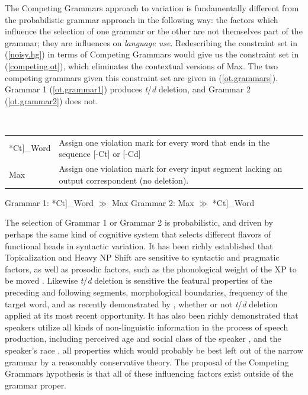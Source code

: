 The Competing Grammars approach to variation is fundamentally different from the probabilistic grammar approach in the following way: the factors which influence the selection of one grammar or the other are not themselves part of the grammar; they are influences on \textsl{language use}.
Redescribing the constraint set in (\ref{noisy.hg}) in terms of Competing Grammars would give us the constraint set in (\ref{competing.ot}), which eliminates the contextual versions of {\sc Max}.
The two competing grammars given this constraint set are given in (\ref{ot.grammars}).
Grammar 1 (\ref{ot.grammar1}) produces {\sl t}/{\sl d} deletion, and Grammar 2 (\ref{ot.grammar2}) does not.
\begin{exe}
	\ex \label{competing.ot}\ \\
	\begin{tabular}{lp{3in}}
	*{\sc Ct}]_{Word}& Assign one violation mark for every word that ends in the sequence [-Ct] or [-Cd]\\
	{\sc Max} & Assign one violation mark for every input segment lacking an output correspondent (no deletion).
	\end{tabular}
	\ex \label{ot.grammars}
		\begin{xlist}
			\ex Grammar 1: *{\sc Ct}]_{Word} $\gg$ {\sc Max} \label{ot.grammar1}
			\ex Grammar 2: {\sc Max} $\gg$ *{\sc Ct}]_{Word} \label{ot.grammar2}
		\end{xlist}
\end{exe}

The selection of Grammar 1 or Grammar 2 is probabilistic, and driven by perhaps the same kind of cognitive system that selects different flavors of functional heads in syntactic variation.
It has been richly established that Topicalization and Heavy NP Shift are sensitive to syntactic and pragmatic factors, as well as prosodic factors, such as the phonological weight of the XP to be moved \citep[e.g.][]{arnoldetal2000, speyer2008, speyer2010, wallenberg2012}. %
Likewise {\sl t}/{\sl d} deletion is sensitive the featural properties of the preceding and following segments, morphological boundaries, frequency of the target word, and as recently demonstrated by \citet{MacKenzie.Tamminga2012}, whether or not {\sl t}/{\sl d} deletion applied at its most recent opportunity.
It has also been richly demonstrated that speakers utilize all kinds of non-linguistic information in the process of speech production, including perceived age and social class of the speaker \citep{Hay2006}, and the speaker's race \citep{StaumCasasanto2010}, all properties which would probably be best left out of the narrow grammar by a reasonably conservative theory.
The proposal of the Competing Grammars hypothesis is that all of these influencing factors exist outside of the grammar proper.

